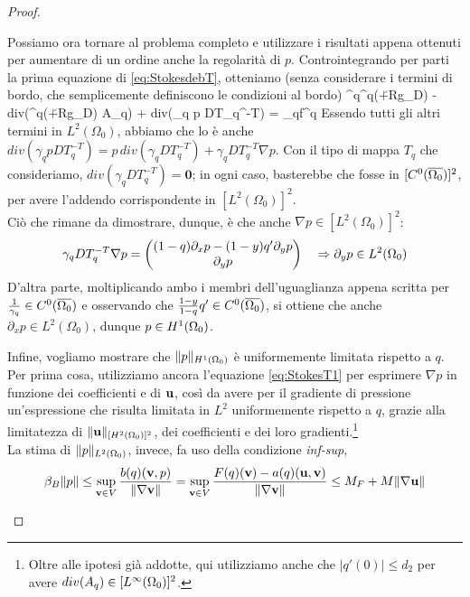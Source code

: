 \begin{proof}
\begin{enumerate}
Possiamo ora tornare al problema completo e utilizzare i risultati appena ottenuti per aumentare di un ordine anche la regolarit\`a di $p$. Controintegrando per parti la prima equazione di \eqref{eq:StokesdebT}, otteniamo (senza considerare i termini di bordo, che semplicemente definiscono le condizioni al bordo)
\beq
	\eta^q\gamma^q(\u+\mathcal R\mathbf g_D) - div(\nu^q\nabla(\u+\mathcal R\mathbf g_D) A_q) + div(\gamma_q p DT_q^{-T}) = \gamma_q\mathbf f^q
\label{eq:StokesT1}
\eeq
Essendo tutti gli altri termini in $L^2(\Omega_0)$, abbiamo che lo \`e anche $div(\gamma_q p DT_q^{-T})= p\, div(\gamma_q DT_q^{-T}) + \gamma_q DT_q^{-T}\nabla p$. Con il tipo di mappa $T_q$ che consideriamo, $div(\gamma_q DT_q^{-T})=\mathbf 0$; in ogni caso, basterebbe che fosse in $[C^0(\overline{{\Omega_0}})]^2$, per avere l'addendo corrispondente in $[L^2(\Omega_0)]^2$.\\
Ciò che rimane da dimostrare, dunque, è che anche $\nabla p\in[L^2(\Omega_0)]^2$:
$$\gamma_qDT_q^{-T}\nabla p = \begin{pmatrix} (1-q)\partial_xp-(1-y)q'\partial_yp\\ \partial_yp\end{pmatrix}\quad\Rightarrow \partial_yp\in L^2({\Omega_0})$$
D'altra parte, moltiplicando ambo i membri dell'uguaglianza appena scritta per $\frac{1}{\gamma_q}\in C^0(\overline{{\Omega_0}})$ e osservando che $\frac{1-y}{1-q}q'\in C^0(\overline{{\Omega_0}})$, si ottiene che anche $\partial_xp\in L^2(\Omega_0)$, dunque $p\in H^1({\Omega_0})$.

Infine, vogliamo mostrare che $\|p\|_{H^1({\Omega_0})}$ è uniformemente limitata rispetto a $q$.\\
Per prima cosa, utilizziamo ancora l'equazione \eqref{eq:StokesT1} per esprimere $\nabla p$ in funzione dei coefficienti e di $\mathbf{u}$, così da avere per il gradiente di pressione un'espressione che risulta limitata in $L^2$ uniformemente rispetto a $q$, grazie alla limitatezza di $\|\mathbf{u}\|_{[H^2({\Omega_0})]^2}$, dei coefficienti e dei loro gradienti.\footnote{Oltre alle ipotesi già addotte, qui utilizziamo anche che $|q'(0)|\leq d_2$ per avere $div(A_q)\in [L^\infty({\Omega_0})]^2$.}\\
La stima di $\|p\|_{L^2({\Omega_0})}$, invece, fa uso della condizione \emph{inf-sup}, %
$$ \beta_{B}\|p\| \leq \sup_{\mathbf{v}\in V} \frac{b(q)(\mathbf v,p)}{\|\nabla\mathbf{v}\|}=\sup_{\mathbf{v}\in V}\frac{F(q)(\mathbf v)-a(q)(\mathbf{u},\mathbf v)}{\|\nabla\mathbf{v}\|} \leq M_F+M\|\nabla\mathbf{u}\|$$


\end{enumerate}
\end{proof}

